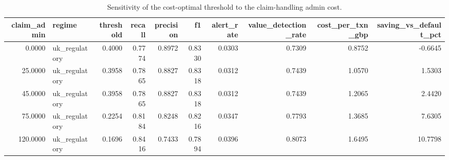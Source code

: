 \begin{table}
\caption{Sensitivity of the cost-optimal threshold to the claim-handling admin cost.}
\label{tab:table10_sensitivity_claim_admin}
\begin{tabular}{rlrrrrrrrr}
\toprule
claim\_admin & regime & threshold & recall & precision & f1 & alert\_rate & value\_detection\_rate & cost\_per\_txn\_gbp & saving\_vs\_default\_pct \\
\midrule
0.0000 & uk\_regulatory & 0.4000 & 0.7774 & 0.8972 & 0.8330 & 0.0303 & 0.7309 & 0.8752 & -0.6645 \\
25.0000 & uk\_regulatory & 0.3958 & 0.7865 & 0.8827 & 0.8318 & 0.0312 & 0.7439 & 1.0570 & 1.5303 \\
45.0000 & uk\_regulatory & 0.3958 & 0.7865 & 0.8827 & 0.8318 & 0.0312 & 0.7439 & 1.2065 & 2.4420 \\
75.0000 & uk\_regulatory & 0.2254 & 0.8184 & 0.8248 & 0.8216 & 0.0347 & 0.7793 & 1.3685 & 7.6305 \\
120.0000 & uk\_regulatory & 0.1696 & 0.8416 & 0.7433 & 0.7894 & 0.0396 & 0.8073 & 1.6495 & 10.7798 \\
\bottomrule
\end{tabular}
\end{table}
